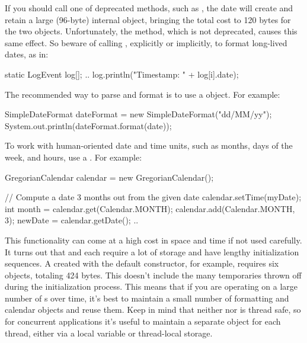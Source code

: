 If you should call one of  deprecated methods, such as
, the date will create and retain
a large (96-byte) internal object, bringing the total cost to 120 bytes for
the two objects. Unfortunately, the  method, which is not
deprecated, causes this same effect. So beware of calling ,
explicitly or implicitly, to format long-lived dates, as in:

\begin{shortlisting}
	static LogEvent log[]; 
	..
	log.println("Timestamp: " + log[i].date);
\end{shortlisting}

The recommended way to parse and format  is 
to use a  object. For example:

\begin{shortlisting}
    SimpleDateFormat dateFormat = 
    	new SimpleDateFormat("dd/MM/yy"); 
    System.out.println(dateFormat.format(date)); 
\end{shortlisting}

To work with human-oriented date and time units, such as
months, days of the week, and hours, use a . For example:

\begin{shortlisting}

	GregorianCalendar calendar = new GregorianCalendar();
	
	// Compute a date 3 months out from the given date
    calendar.setTime(myDate);
	int month = calendar.get(Calendar.MONTH); 
	calendar.add(Calendar.MONTH, 3); 
	newDate = calendar.getDate();
	..
    
\end{shortlisting}

This functionality can come at a high cost in space and time if not
used carefully. It turns out that  and
 each require a lot of storage and have lengthy
initialization sequences.
A  created with the default constructor, for
example, requires six objects, totaling 424 bytes. This doesn't include the many
temporaries thrown off during the initialization process.  This means that if
you are operating on a large number of s over time, it's best to maintain a small number of
formatting and calendar objects and reuse them.  Keep in mind that neither
 nor  is thread safe, so for
concurrent applications it's useful to maintain a separate object for each
thread, either via a local variable or thread-local storage.

